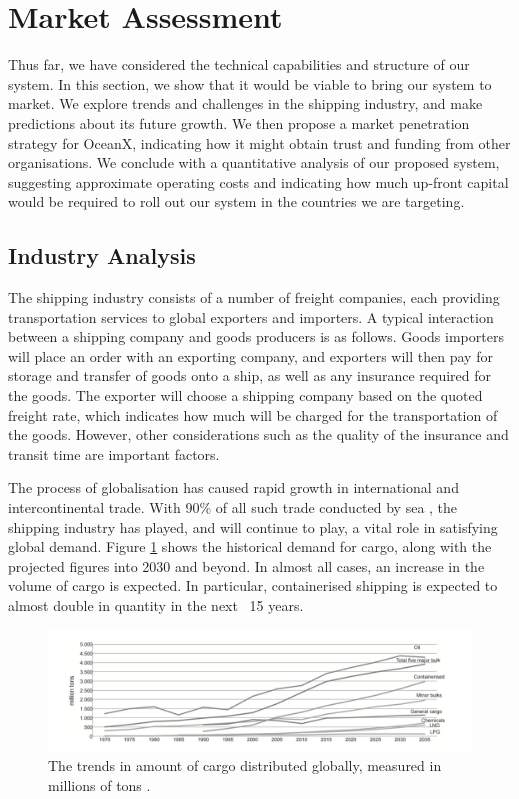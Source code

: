 \newpage
\section{Market Assessment}
\label{sec:market_assessment}

Thus far, we have considered the technical capabilities and structure of our system. In this section, we show that it would be viable to bring our system to market. We explore trends and challenges in the shipping industry, and make predictions about its future growth. We then propose a market penetration strategy for OceanX, indicating how it might obtain trust and funding from other organisations. We conclude with a quantitative analysis of our proposed system, suggesting approximate operating costs and indicating how much up-front capital would be required to roll out our system in the countries we are targeting. 

\subsection{Industry Analysis}

The shipping industry consists of a number of freight companies, each providing transportation services to global exporters and importers. A typical interaction between a shipping company and goods producers is as follows. Goods importers will place an order with an exporting company, and exporters will then pay for storage and transfer of goods onto a ship, as well as any insurance required for the goods. The exporter will choose a shipping company based on the quoted freight rate, which indicates how much will be charged for the transportation of the goods. However, other considerations such as the quality of the insurance and transit time are important factors. 

The process of globalisation has caused rapid growth in international and intercontinental trade. With 90\% of all such trade conducted by sea \cite{IMOfacts}, the shipping industry has played, and will continue to play, a vital role in satisfying global demand. Figure \ref{fig:cargo_trends} shows the historical demand for cargo, along with the projected figures into 2030 and beyond. In almost all cases, an increase in the volume of cargo is expected. In particular, containerised shipping is expected to almost double in quantity in the next ~15 years.

\begin{figure}[h!]
	\includegraphics[width=\textwidth]{images/trade_trends}
	\caption{The trends in amount of cargo distributed globally, measured in millions of tons \cite{BluePlanet}.}
	\label{fig:cargo_trends}
\end{figure}

